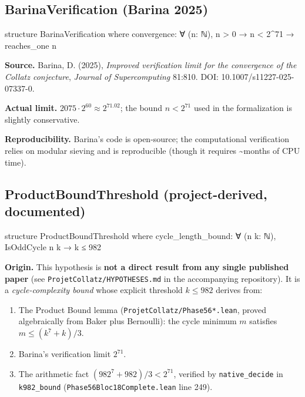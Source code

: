 \documentclass[
  11pt]{amsart}
\newenvironment{Shaded}{}{}
\newcommand{\NormalTok}[1]{#1}
\providecommand{\tightlist}{%
  \setlength{\itemsep}{0pt}\setlength{\parskip}{0pt}}
\theoremstyle{plain}
\theoremstyle{definition}
\theoremstyle{remark}
\begin{document}
\subsection{BarinaVerification (Barina
2025)}\label{barinaverification-barina-2025}

\begin{Shaded}
\begin{Highlighting}[]
\NormalTok{structure BarinaVerification where}
\NormalTok{  convergence: ∀ (n: ℕ), n \textgreater{} 0 → n \textless{} 2\^{}71 → reaches\_one n}
\end{Highlighting}
\end{Shaded}

\textbf{Source.} Barina, D. (2025), \emph{Improved verification limit
for the convergence of the Collatz conjecture}, \emph{Journal of
Supercomputing} 81:810. DOI: 10.1007/s11227-025-07337-0.

\textbf{Actual limit.} \(2075 \cdot 2^{60} \approx 2^{71.02}\); the
bound \(n < 2^{71}\) used in the formalization is slightly conservative.

\textbf{Reproducibility.} Barina's code is open-source; the
computational verification relies on modular sieving and is reproducible
(though it requires \textasciitilde months of CPU time).

\subsection{ProductBoundThreshold (project-derived,
documented)}\label{productboundthreshold-project-derived-documented}

\begin{Shaded}
\begin{Highlighting}[]
\NormalTok{structure ProductBoundThreshold where}
\NormalTok{  cycle\_length\_bound: ∀ (n k: ℕ), IsOddCycle n k → k ≤ 982}
\end{Highlighting}
\end{Shaded}

\textbf{Origin.} This hypothesis is \textbf{not a direct result from any
single published paper} (see \texttt{ProjetCollatz/HYPOTHESES.md} in the
accompanying repository). It is a \emph{cycle-complexity bound} whose
explicit threshold \(k \leq 982\) derives from:

\begin{enumerate}
\def\labelenumi{\arabic{enumi}.}
\tightlist
\item
  The Product Bound lemma (\texttt{ProjetCollatz/Phase56*.lean}, proved
  algebraically from Baker plus Bernoulli): the cycle minimum \(m\)
  satisfies \(m \leq (k^7 + k)/3\).
\item
  Barina's verification limit \(2^{71}\).
\item
  The arithmetic fact \((982^7 + 982)/3 < 2^{71}\), verified by
  \texttt{native\_decide} in \texttt{k982\_bound}
  (\texttt{Phase56Bloc18Complete.lean} line 249).
\end{enumerate}
\end{document}
